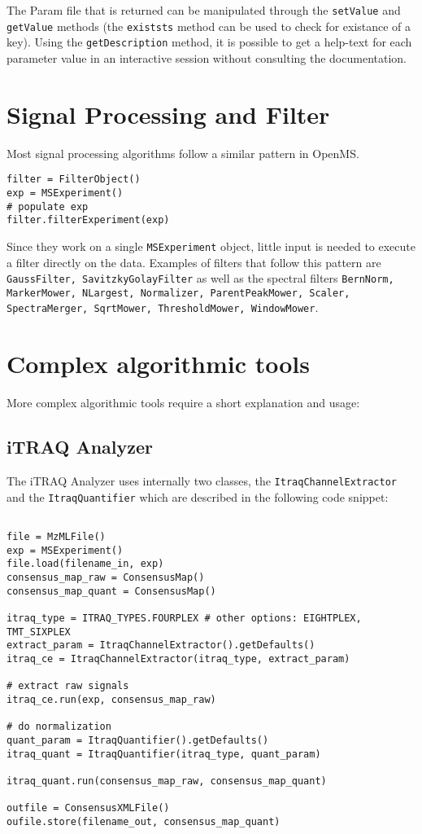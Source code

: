 \documentclass[10pt]{article}
\begin{document}
The Param file that is returned can be manipulated through the \texttt{setValue} and
\texttt{getValue} methods (the \texttt{existsts} method can be used to check for existance of a
key). Using the \texttt{getDescription} method, it is possible to get a help-text for
each parameter value in an interactive session without consulting the documentation.

\section{Signal Processing and Filter}
Most signal processing algorithms follow a similar pattern in OpenMS.

\begin{verbatim}
filter = FilterObject()
exp = MSExperiment()
# populate exp
filter.filterExperiment(exp)
\end{verbatim}

Since they work on a single \texttt{MSExperiment} object, little input is needed to
execute a filter directly on the data. Examples of filters that follow this
pattern are \texttt{GaussFilter, SavitzkyGolayFilter} as well as the spectral
filters \texttt{BernNorm, MarkerMower, NLargest, Normalizer, ParentPeakMower,
Scaler, SpectraMerger, SqrtMower, ThresholdMower, WindowMower}.

\section{Complex algorithmic tools}

More complex algorithmic tools require a short explanation and usage:

\subsection{iTRAQ Analyzer}

The iTRAQ Analyzer uses internally two classes, the
\texttt{ItraqChannelExtractor} and the \texttt{ItraqQuantifier} which are
described in the following code snippet:

\begin{verbatim}

file = MzMLFile()
exp = MSExperiment()
file.load(filename_in, exp)
consensus_map_raw = ConsensusMap()
consensus_map_quant = ConsensusMap()

itraq_type = ITRAQ_TYPES.FOURPLEX # other options: EIGHTPLEX, TMT_SIXPLEX
extract_param = ItraqChannelExtractor().getDefaults()
itraq_ce = ItraqChannelExtractor(itraq_type, extract_param)

# extract raw signals
itraq_ce.run(exp, consensus_map_raw)

# do normalization
quant_param = ItraqQuantifier().getDefaults()
itraq_quant = ItraqQuantifier(itraq_type, quant_param)

itraq_quant.run(consensus_map_raw, consensus_map_quant)

outfile = ConsensusXMLFile()
oufile.store(filename_out, consensus_map_quant)
\end{verbatim}
\end{document}
